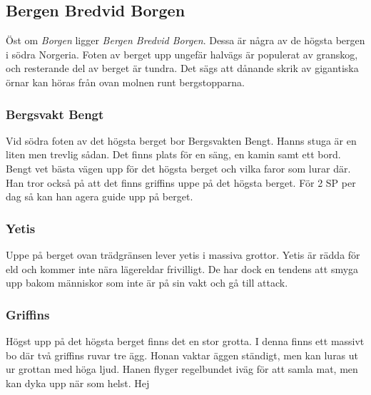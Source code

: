 \subsection{Bergen Bredvid Borgen}
\label{bergenBredvidBorgen}
Öst om \textit{Borgen} ligger \textit{Bergen Bredvid Borgen}. Dessa är några av de högsta bergen i södra Norgeria. Foten av berget upp ungefär halvägs är populerat av granskog, och resterande del av berget är tundra. Det sägs att dånande skrik av gigantiska örnar kan höras från ovan molnen runt bergstopparna.

\subsubsection{Bergsvakt Bengt}
Vid södra foten av det högsta berget bor Bergsvakten Bengt. Hanns stuga är en liten men trevlig sådan. Det finns plats för en säng, en kamin samt ett bord. Bengt vet bästa vägen upp för det högsta berget och vilka faror som lurar där. Han tror också på att det finns griffins uppe på det högsta berget. För 2 SP per dag så kan han agera guide upp på berget.

\subsubsection{Yetis}
Uppe på berget ovan trädgränsen lever yetis i massiva grottor. Yetis är rädda för eld och kommer inte nära lägereldar frivilligt. De har dock en tendens att smyga upp bakom människor som inte är på sin vakt och gå till attack.

\subsubsection{Griffins}
Högst upp på det högsta berget finns det en stor grotta. I denna finns ett massivt bo där två griffins ruvar tre ägg. Honan vaktar äggen ständigt, men kan luras ut ur grottan med höga ljud. Hanen flyger regelbundet iväg för att samla mat, men kan dyka upp när som helst.
Hej